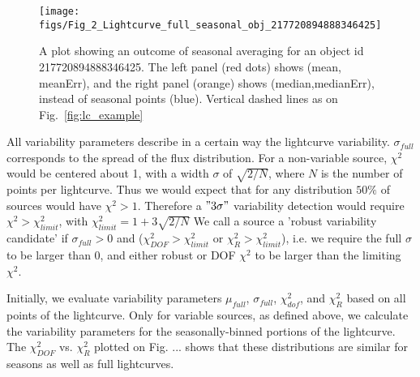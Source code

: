 \documentclass[fleqn,usenatbib]{mnras}  %
\begin{document}
\begin{figure*}
\label{fig:lc_example_seasonal}
 \texttt{[image: figs/Fig\_2\_Lightcurve\_full\_seasonal\_obj\_217720894888346425]}
 \cprotect\caption{A plot showing an outcome of seasonal averaging for an object id 217720894888346425. The left panel (red dots) shows  (mean, meanErr),  and the right panel (orange) shows (median,medianErr), instead of seasonal points (blue). Vertical dashed lines as on Fig.~\ref{fig:lc_example}}
\end{figure*}


%
%

%
%

%
% 
All variability parameters describe in a certain way the lightcurve variability. $\sigma_{full}$  corresponds to the spread of the flux distribution. For a non-variable source, $\chi^{2}$ would be centered about 1, with a width $\sigma$ of $\sqrt{2/N}$, where $N$ is the number of points per lightcurve. Thus we would expect that for any distribution $50\%$ of sources would have $\chi^{2}>1$. Therefore a $"3\sigma"$ variability detection would require $\chi^{2} > \chi^{2}_{limit}$, with $\chi^{2}_{limit} = 1 + 3\sqrt{2/N}$
We call a source a 'robust variability candidate' if $\sigma_{full}>0$ and ($\chi^{2}_{DOF} > \chi^{2}_{limit}$ or $\chi^{2}_{R} > \chi^{2}_{limit}$), i.e. we require the full $\sigma$ to be larger than 0, and either robust or DOF $\chi^{2}$ to be larger than the limiting $\chi^{2}$. 

%
% 

Initially, we evaluate variability parameters $\mu_{full}$, $\sigma_{full}$, $\chi^{2}_{dof}$, and $\chi^{2}_{R}$ based on all points of the lightcurve. Only for variable sources, as defined above, we calculate the variability parameters for the seasonally-binned portions of the lightcurve. The $\chi^{2}_{DOF}$ vs. $\chi^{2}_{R}$ plotted on Fig. ...  shows that these distributions are similar for seasons as well as full lightcurves.    
\end{document}
